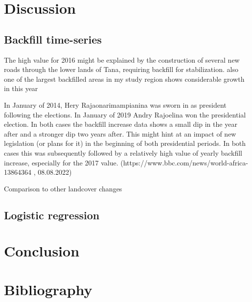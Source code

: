 \documentclass[11pt, letterpaper, oneside]{article}
\begin{document}
\newpage
\section{Discussion}

\subsection{Backfill time-series}
The high value for 2016 might be explained by the construction of several new roads through the lower lands of Tana, requiring backfill for stabilization. also one of the largest backfilled areas in my study region shows considerable growth in this year

In January of 2014, Hery Rajaonarimampianina was sworn in as president following the elections.
In January of 2019 Andry Rajoelina won the presidential election. In both cases the backfill increase data shows a small dip in the year after and a stronger dip two years after. This might hint at an impact of new legislation (or plans for it) in the beginning of both presidential periods. In both cases this was subsequently followed by a relatively high value of yearly backfill increase, especially for the 2017 value. (https://www.bbc.com/news/world-africa-13864364 , 08.08.2022)

Comparison to other landcover changes

\subsection{Logistic regression} 

\section{Conclusion}

\section*{Bibliography}
\printbibliography
\end{document}
